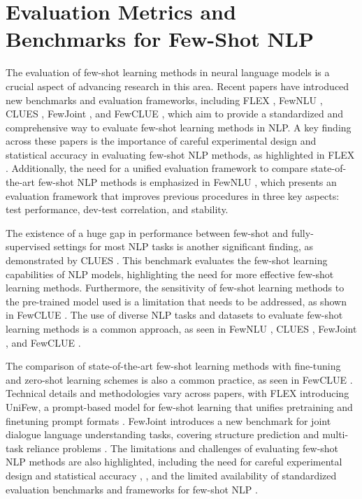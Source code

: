 \documentclass[conference]{IEEEtran}
\begin{document}
\section{Evaluation Metrics and Benchmarks for Few-Shot NLP}
The evaluation of few-shot learning methods in neural language models is a crucial aspect of advancing research in this area. Recent papers have introduced new benchmarks and evaluation frameworks, including FLEX \cite{b1}, FewNLU \cite{b2}, CLUES \cite{b3}, FewJoint \cite{b4}, and FewCLUE \cite{b5}, which aim to provide a standardized and comprehensive way to evaluate few-shot learning methods in NLP. A key finding across these papers is the importance of careful experimental design and statistical accuracy in evaluating few-shot NLP methods, as highlighted in FLEX \cite{b1}. Additionally, the need for a unified evaluation framework to compare state-of-the-art few-shot NLP methods is emphasized in FewNLU \cite{b2}, which presents an evaluation framework that improves previous procedures in three key aspects: test performance, dev-test correlation, and stability.

The existence of a huge gap in performance between few-shot and fully-supervised settings for most NLP tasks is another significant finding, as demonstrated by CLUES \cite{b3}. This benchmark evaluates the few-shot learning capabilities of NLP models, highlighting the need for more effective few-shot learning methods. Furthermore, the sensitivity of few-shot learning methods to the pre-trained model used is a limitation that needs to be addressed, as shown in FewCLUE \cite{b5}. The use of diverse NLP tasks and datasets to evaluate few-shot learning methods is a common approach, as seen in FewNLU \cite{b2}, CLUES \cite{b3}, FewJoint \cite{b4}, and FewCLUE \cite{b5}.

The comparison of state-of-the-art few-shot learning methods with fine-tuning and zero-shot learning schemes is also a common practice, as seen in FewCLUE \cite{b5}. Technical details and methodologies vary across papers, with FLEX introducing UniFew, a prompt-based model for few-shot learning that unifies pretraining and finetuning prompt formats \cite{b1}. FewJoint introduces a new benchmark for joint dialogue language understanding tasks, covering structure prediction and multi-task reliance problems \cite{b4}. The limitations and challenges of evaluating few-shot NLP methods are also highlighted, including the need for careful experimental design and statistical accuracy \cite{b1}, \cite{b2}, and the limited availability of standardized evaluation benchmarks and frameworks for few-shot NLP \cite{b5}.
\end{document}
